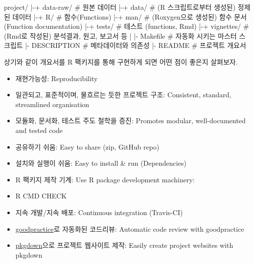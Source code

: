 \documentclass[
  letterpaper,
  chapter,a4paper,showtrims,openright,hidelinks]{oblivoir}
\newenvironment{Shaded}{\begin{snugshade}}{\end{snugshade}}
\newcommand{\CommentTok}[1]{\textcolor[rgb]{0.37,0.37,0.37}{#1}}
\newcommand{\ExtensionTok}[1]{\textcolor[rgb]{0.00,0.23,0.31}{#1}}
\newcommand{\KeywordTok}[1]{\textcolor[rgb]{0.00,0.23,0.31}{#1}}
\newcommand{\NormalTok}[1]{\textcolor[rgb]{0.00,0.23,0.31}{#1}}
\providecommand{\tightlist}{%
  \setlength{\itemsep}{0pt}\setlength{\parskip}{0pt}}\usepackage{longtable,booktabs,array}
\begin{document}
\begin{Shaded}
\begin{Highlighting}[]
\ExtensionTok{project/}
\KeywordTok{|}\ExtensionTok{{-}+}\NormalTok{ data{-}raw/   }\CommentTok{\# 원본 데이터}
\KeywordTok{|}\ExtensionTok{{-}+}\NormalTok{ data/       }\CommentTok{\# (R 스크립트로부터 생성된) 정제된 데이터}
\KeywordTok{|}\ExtensionTok{{-}+}\NormalTok{ R/          }\CommentTok{\# 함수(Functions)}
\KeywordTok{|}\ExtensionTok{{-}+}\NormalTok{ man/        }\CommentTok{\# (Roxygen으로 생성된) 함수 문서(Function documentation)}
\KeywordTok{|}\ExtensionTok{{-}+}\NormalTok{ tests/      }\CommentTok{\# 테스트 (functions, Rmd)}
\KeywordTok{|}\ExtensionTok{{-}+}\NormalTok{ vignettes/  }\CommentTok{\# (Rmd로 작성된) 분석결과, 원고, 보고서 등}
\KeywordTok{|}
\KeywordTok{|}\ExtensionTok{{-}}\NormalTok{ Makefile    }\CommentTok{\# 자동화 시키는 마스터 스크립트}
\KeywordTok{|}\ExtensionTok{{-}}\NormalTok{ DESCRIPTION }\CommentTok{\# 메타데이터와 의존성}
\KeywordTok{|}\ExtensionTok{{-}}\NormalTok{ README      }\CommentTok{\# 프로젝트 개요서}
\end{Highlighting}
\end{Shaded}

상기와 같이 개요서를 R 팩키지를 통해 구현하게 되면 어떤 점이 좋은지
살펴보자.

\begin{itemize}
\tightlist
\item
  재현가능성: Reproducibility
\item
  일관되고, 표준적이며, 물흐르는 듯한 프로젝트 구조: Consistent,
  standard, streamlined organisation
\item
  모듈화, 문서화, 테스트 주도 철학을 증진: Promotes modular,
  well-documented and tested code
\item
  공유하기 쉬움: Easy to share (zip, GitHub repo)
\item
  설치와 실행이 쉬움: Easy to install \& run (Dependencies)
\item
  R 팩키지 제작 기계: Use R package development machinery:
\item
  R CMD CHECK
\item
  지속 개발/지속 배포: Continuous integration (Travis-CI)
\item
  \href{https://github.com/MangoTheCat/goodpractice}{goodpractice}로
  자동화된 코드리뷰: Automatic code review with goodpractice
\item
  \href{https://github.com/r-lib/pkgdown}{pkgdown}으로 프로젝트 웹사이트
  제작: Easily create project websites with pkgdown
\end{itemize}
\end{document}
